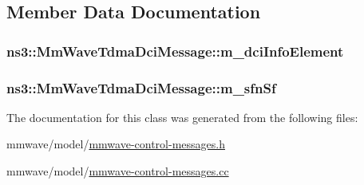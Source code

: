 \subsection{Member Data Documentation}
\subsubsection[{\texorpdfstring{m\+\_\+dci\+Info\+Element}{m_dciInfoElement}}]{ ns3\+::\+Mm\+Wave\+Tdma\+Dci\+Message\+::m\+\_\+dci\+Info\+Element\hspace{0.3cm}{\ttfamily [private]}}\hypertarget{classns3_1_1MmWaveTdmaDciMessage_a3c28eae5695ce946b5979e253341fbec}{}\label{classns3_1_1MmWaveTdmaDciMessage_a3c28eae5695ce946b5979e253341fbec}
\subsubsection[{\texorpdfstring{m\+\_\+sfn\+Sf}{m_sfnSf}}]{ ns3\+::\+Mm\+Wave\+Tdma\+Dci\+Message\+::m\+\_\+sfn\+Sf\hspace{0.3cm}{\ttfamily [private]}}\hypertarget{classns3_1_1MmWaveTdmaDciMessage_aa95052e3260286465e75313247709900}{}\label{classns3_1_1MmWaveTdmaDciMessage_aa95052e3260286465e75313247709900}


The documentation for this class was generated from the following files\+:\begin{DoxyCompactItemize}
\item 
mmwave/model/\hyperlink{mmwave-control-messages_8h}{mmwave-\/control-\/messages.\+h}\item 
mmwave/model/\hyperlink{mmwave-control-messages_8cc}{mmwave-\/control-\/messages.\+cc}\end{DoxyCompactItemize}
